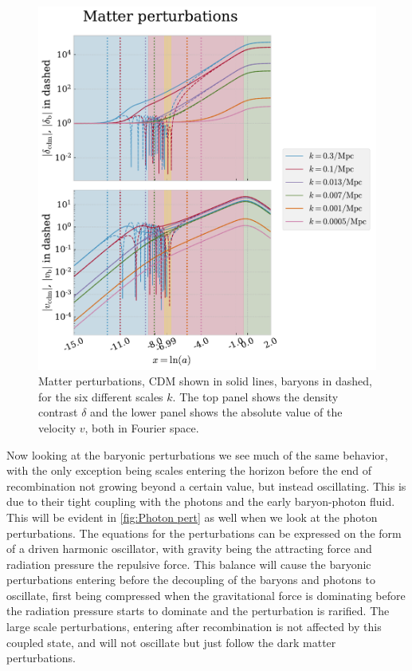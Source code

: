 \documentclass[10pt,a4paper]{article}
\providecommand{\rCDM}
{\ensuremath{
\textrm{CDM}
}
}
\begin{document}
\begin{figure}[ht!]
  \centering
  \includegraphics[scale=0.5]{../figs/matter_pert.pdf}
  \caption{Matter perturbations, \rCDM shown in solid lines, baryons in dashed, for the six different scales $k$. The top panel shows the density contrast $\delta$ and the lower panel shows the absolute value of the velocity $v$, both in Fourier space.}
  \label{fig:matter pert}
\end{figure}

Now looking at the baryonic perturbations we see much of the same behavior, with the only exception being scales entering the horizon before the end of recombination not growing beyond a certain value, but instead oscillating. This is due to their tight coupling with the photons and the early baryon-photon fluid. This will be evident in \cref{fig:Photon pert} as well when we look at the photon perturbations. The equations for the perturbations can be expressed on the form of a driven harmonic oscillator, with gravity being the attracting force and radiation pressure the repulsive force. This balance will cause the baryonic perturbations entering before the decoupling of the baryons and photons to oscillate, first being compressed when the gravitational force is dominating before the radiation pressure starts to dominate and the perturbation is rarified. The large scale perturbations, entering after recombination is not affected by this coupled state, and will not oscillate but just follow the dark matter perturbations.
\end{document}
